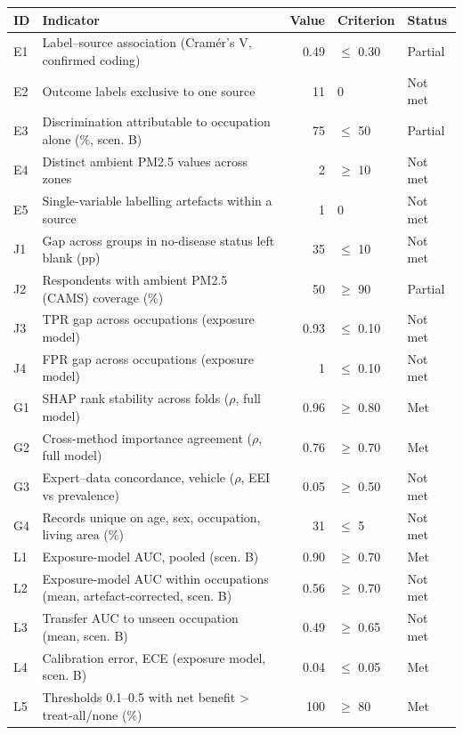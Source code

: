 \begin{tabular}{lp{7.2cm}rll}
\toprule
ID & Indicator & Value & Criterion & Status \\
\midrule
E1 & Label--source association (Cramér’s V, confirmed coding) & 0.49 & $\leq$ 0.30 & Partial \\
E2 & Outcome labels exclusive to one source & 11 & 0 & Not met \\
E3 & Discrimination attributable to occupation alone (\%, scen. B) & 75 & $\leq$ 50 & Partial \\
E4 & Distinct ambient PM2.5 values across zones & 2 & $\geq$ 10 & Not met \\
E5 & Single-variable labelling artefacts within a source & 1 & 0 & Not met \\
\midrule
J1 & Gap across groups in no-disease status left blank (pp) & 35 & $\leq$ 10 & Not met \\
J2 & Respondents with ambient PM2.5 (CAMS) coverage (\%) & 50 & $\geq$ 90 & Partial \\
J3 & TPR gap across occupations (exposure model) & 0.93 & $\leq$ 0.10 & Not met \\
J4 & FPR gap across occupations (exposure model) & 1 & $\leq$ 0.10 & Not met \\
\midrule
G1 & SHAP rank stability across folds ($\rho$, full model) & 0.96 & $\geq$ 0.80 & Met \\
G2 & Cross-method importance agreement ($\rho$, full model) & 0.76 & $\geq$ 0.70 & Met \\
G3 & Expert--data concordance, vehicle ($\rho$, EEI vs prevalence) & 0.05 & $\geq$ 0.50 & Not met \\
G4 & Records unique on age, sex, occupation, living area (\%) & 31 & $\leq$ 5 & Not met \\
\midrule
L1 & Exposure-model AUC, pooled (scen. B) & 0.90 & $\geq$ 0.70 & Met \\
L2 & Exposure-model AUC within occupations (mean, artefact-corrected, scen. B) & 0.56 & $\geq$ 0.70 & Not met \\
L3 & Transfer AUC to unseen occupation (mean, scen. B) & 0.49 & $\geq$ 0.65 & Not met \\
L4 & Calibration error, ECE (exposure model, scen. B) & 0.04 & $\leq$ 0.05 & Met \\
L5 & Thresholds 0.1--0.5 with net benefit > treat-all/none (\%) & 100 & $\geq$ 80 & Met \\
\bottomrule
\end{tabular}
